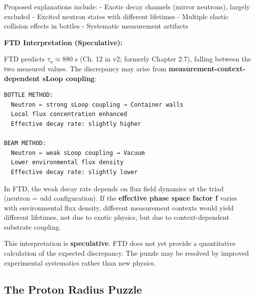 \documentclass[
  11pt,
  letterpaper,
  twoside,
  openright]{book}
\begin{document}
Proposed explanations include: - Exotic decay channels (mirror
neutrons), largely excluded - Excited neutron states with different
lifetimes - Multiple elastic collision effects in bottles - Systematic
measurement artifacts

\textbf{FTD Interpretation (Speculative):}

FTD predicts \(\tau_n \approx 880\) s (Ch. 12 in v2; formerly Chapter
2.7), falling between the two measured values. The discrepancy may arise
from \textbf{measurement-context-dependent sLoop coupling}:

\begin{verbatim}
BOTTLE METHOD:
  Neutron ← strong sLoop coupling → Container walls
  Local flux concentration enhanced
  Effective decay rate: slightly higher

BEAM METHOD:
  Neutron ← weak sLoop coupling → Vacuum
  Lower environmental flux density
  Effective decay rate: slightly lower
\end{verbatim}

In FTD, the weak decay rate depends on flux field dynamics at the triad
(neutron = udd configuration). If the \textbf{effective phase space
factor f} varies with environmental flux density, different measurement
contexts would yield different lifetimes, not due to exotic physics, but
due to context-dependent substrate coupling.

\begin{tcolorbox}[enhanced jigsaw, coltitle=black, colbacktitle=quarto-callout-warning-color!10!white, toprule=.15mm, colframe=quarto-callout-warning-color-frame, arc=.35mm, opacityback=0, bottomtitle=1mm, toptitle=1mm, breakable, colback=white, titlerule=0mm, opacitybacktitle=0.6, title=\textcolor{quarto-callout-warning-color}{\faExclamationTriangle}\hspace{0.5em}{Epistemic Status}, rightrule=.15mm, bottomrule=.15mm, leftrule=.75mm, left=2mm]

This interpretation is \textbf{speculative}. FTD does not yet provide a
quantitative calculation of the expected discrepancy. The puzzle may be
resolved by improved experimental systematics rather than new physics.

\end{tcolorbox}

\subsection{The Proton Radius Puzzle}\label{sec-proton-radius}
\end{document}
